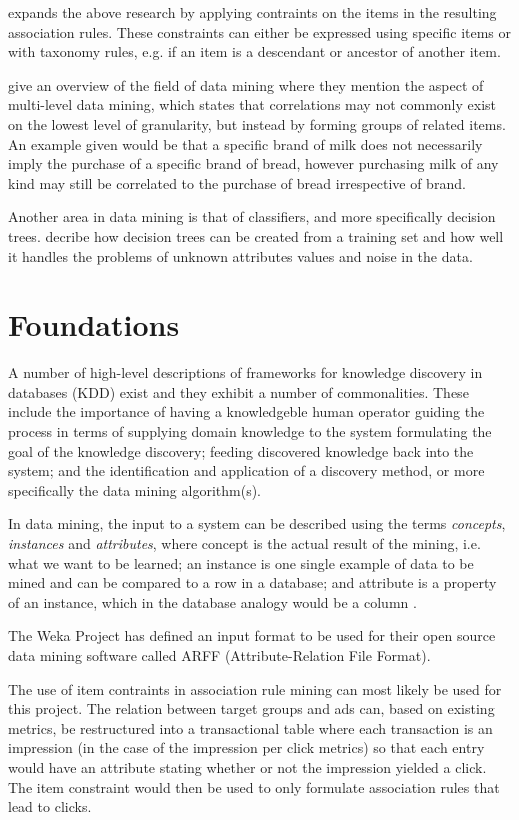\documentclass[a4paper]{article}
\begin{document}
\citet{Srikant1997} expands the above research by applying contraints on the items in the resulting association rules. These
constraints can either be expressed using specific items or with taxonomy rules, e.g. if an item is a descendant or ancestor
of another item.

\citet{Chen1996} give an overview of the field of data mining where they mention the aspect of multi-level data mining, which
states that correlations may not commonly exist on the lowest level of granularity, but instead by forming groups of related
items. An example given would be that a specific brand of milk does not necessarily imply the purchase of a specific brand of
bread, however purchasing milk of any kind may still be correlated to the purchase of bread irrespective of brand.

Another area in data mining is that of classifiers, and more specifically decision trees. \citet{Quinlan1986} decribe how
decision trees can be created from a training set and how well it handles the problems of unknown attributes values and noise
in the data.

\section{Foundations}

A number of high-level descriptions of frameworks for knowledge discovery in databases (KDD) exist \citep{Fayyad1996,Frawley1992} 
and they exhibit a number of commonalities. These include the importance of having a knowledgeble human operator guiding the 
process in terms of supplying domain knowledge to the system formulating the goal of the knowledge discovery; feeding discovered
knowledge back into the system; and the identification and application of a discovery method, or more specifically the data mining
algorithm(s). 

In data mining, the input to a system can be described using the terms \emph{concepts}, \emph{instances} and \emph{attributes},
where concept is the actual result of the mining, i.e. what we want to be learned; an instance is one single example of data to be
mined and can be compared to a row in a database; and attribute is a property of an instance, which in the database analogy would
be a column \citep{Witten2011}.

The Weka Project has defined an input format to be used for their open source data mining software called ARFF (Attribute-Relation
File Format).

The use of item contraints in association rule mining \citep{Srikant1997} can most likely be used for this project. The
relation between target groups and ads can, based on existing metrics, be restructured into a transactional table where each
transaction is an impression (in the case of the impression per click metrics) so that each entry would have an attribute
stating whether or not the impression yielded a click. The item constraint would then be used to only formulate association
rules that lead to clicks.
\end{document}

